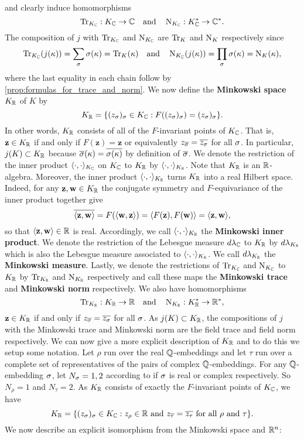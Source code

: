     and clearly induce homomorphisms
    \[
      \operatorname{\mathrm{Tr}}_{K_{\mathbb{C}}}:K_{\mathbb{C}} \to \mathbb{C} \quad \text{and} \quad \operatorname{\mathrm{N}}_{K_{\mathbb{C}}}:K_{\mathbb{C}}^{\ast} \to \mathbb{C}^{\ast}.
    \]
    The composition of $j$ with $\operatorname{\mathrm{Tr}}_{K_{\mathbb{C}}}$ and $\operatorname{\mathrm{N}}_{K_{\mathbb{C}}}$ are $\operatorname{\mathrm{Tr}}_{K}$ and $\operatorname{\mathrm{N}}_{K}$ respectively since
    \[
      \operatorname{\mathrm{Tr}}_{K_{\mathbb{C}}}(j(\kappa)) = \sum_{\sigma}\sigma(\kappa) = \operatorname{\mathrm{Tr}}_{K}(\kappa) \quad \text{and} \quad \operatorname{\mathrm{N}}_{K_{\mathbb{C}}}(j(\kappa)) = \prod_{\sigma}\sigma(\kappa) = \operatorname{\mathrm{N}}_{K}(\kappa),
    \]
    where the last equality in each chain follow by \cref{prop:formulas_for_trace_and_norm}. We now define the \textbf{Minkowski space} $K_{\mathbb{R}}$ of $K$ by
    \[
      K_{\mathbb{R}} = \{(z_{\sigma})_{\sigma} \in K_{\mathbb{C}}:F((z_{\sigma})_{\sigma}) = (z_{\sigma})_{\sigma}\}.
    \]
    In other words, $K_{\mathbb{R}}$ consists of all of the $F$-invariant points of $K_{\mathbb{C}}$. That is, $\mathbf{z} \in K_{\mathbb{R}}$ if and only if $F(\mathbf{z}) = \mathbf{z}$ or equivalently $z_{\overline{\sigma}} = \overline{z_{\sigma}}$ for all $\sigma$. In particular, $j(K) \subset K_{\mathbb{R}}$ because $\overline{\sigma}(\kappa) = \overline{\sigma(\kappa)}$ by definition of $\overline{\sigma}$. We denote the restriction of the inner product $\langle\cdot,\cdot\rangle_{K_{\mathbb{C}}}$ on $K_{\mathbb{C}}$ to $K_{\mathbb{R}}$ by $\langle\cdot,\cdot\rangle_{K_{\mathbb{R}}}$. Note that $K_{\mathbb{R}}$ is an $\mathbb{R}$-algebra. Moreover, the inner product $\langle\cdot,\cdot\rangle_{K_{\mathbb{R}}}$ turns $K_{\mathbb{R}}$ into a real Hilbert space. Indeed, for any $\mathbf{z},\mathbf{w} \in K_{\mathbb{R}}$ the conjugate symmetry and $F$-equivariance of the inner product together give
    \[
      \overline{\langle\mathbf{z},\mathbf{w}\rangle} = F(\langle\mathbf{w},\mathbf{z}\rangle) = \langle F(\mathbf{z}),F(\mathbf{w})\rangle = \langle\mathbf{z},\mathbf{w}\rangle,
    \]
    so that $\langle\mathbf{z},\mathbf{w}\rangle \in \mathbb{R}$ is real. Accordingly, we call $\langle\cdot,\cdot\rangle_{K_{\mathbb{R}}}$ the \textbf{Minkowski inner product}. We denote the restriction of the Lebesgue measure $d\lambda_{\mathbb{C}}$ to $K_{\mathbb{R}}$ by $d\lambda_{K_{\mathbb{R}}}$ which is also the Lebesgue measure associated to $\langle\cdot,\cdot\rangle_{K_{\mathbb{R}}}$. We call $d\lambda_{K_{\mathbb{R}}}$ the \textbf{Minkowski measure}. Lastly, we denote the restrictions of $\operatorname{\mathrm{Tr}}_{K_{\mathbb{C}}}$ and $\operatorname{\mathrm{N}}_{K_{\mathbb{C}}}$ to $K_{\mathbb{R}}$ by $\operatorname{\mathrm{Tr}}_{K_{\mathbb{R}}}$ and $\operatorname{\mathrm{N}}_{K_{\mathbb{R}}}$ respectively and call these maps the \textbf{Minkowski trace} and \textbf{Minkowski norm} respectively. We also have homomorphisms
    \[
      \operatorname{\mathrm{Tr}}_{K_{\mathbb{R}}}:K_{\mathbb{R}} \to \mathbb{R} \quad \text{and} \quad \operatorname{\mathrm{N}}_{K_{\mathbb{R}}}:K_{\mathbb{R}}^{\ast} \to \mathbb{R}^{\ast},
    \]
    $\mathbf{z} \in K_{\mathbb{R}}$ if and only if $z_{\overline{\sigma}} = \overline{z_{\sigma}}$ for all $\sigma$. As $j(K) \subset K_{\mathbb{R}}$, the compositions of $j$ with the Minkowski trace and Minkowski norm are the field trace and field norm respectively. We can now give a more explicit description of $K_{\mathbb{R}}$ and to do this we setup some notation. Let $\rho$ run over the real $\mathbb{Q}$-embeddings and let $\tau$ run over a complete set of representatives of the pairs of complex $\mathbb{Q}$-embeddings. For any $\mathbb{Q}$-embedding $\sigma$, let $N_{\sigma} = 1,2$ according to if $\sigma$ is real or complex respectively. So $N_{\rho} = 1$ and $N_{\tau} = 2$. As $K_{\mathbb{R}}$ consists of exactly the $F$-invariant points of $K_{\mathbb{C}}$, we have
    \[
      K_{\mathbb{R}} = \{(z_{\sigma})_{\sigma} \in K_{\mathbb{C}}:\text{$z_{\rho} \in \mathbb{R}$ and $z_{\overline{\tau}} = \overline{z_{\tau}}$ for all $\rho$ and $\tau$}\}.
    \]
    We now describe an explicit isomorphism from the Minkowski space and $\mathbb{R}^{n}$:
    
